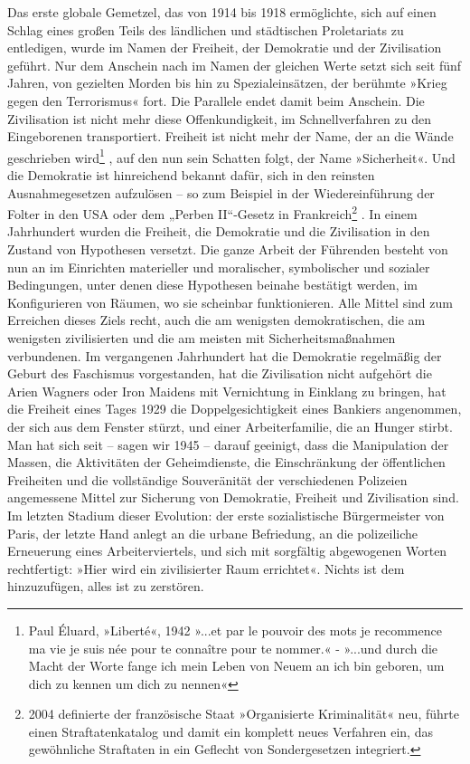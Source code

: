 
Das erste globale Gemetzel, das von 1914 bis 1918 ermöglichte, sich
auf einen Schlag eines großen Teils des ländlichen und städtischen
Proletariats zu entledigen, wurde im Namen der Freiheit, der
Demokratie und der Zivilisation geführt. Nur dem Anschein nach im
Namen der gleichen Werte setzt sich seit fünf Jahren, von gezielten
Morden bis hin zu Spezialeinsätzen, der berühmte »Krieg gegen den
Terrorismus« fort. Die Parallele endet damit beim Anschein. Die
Zivilisation ist nicht mehr diese Offenkundigkeit, im
Schnellverfahren zu den Eingeborenen transportiert. Freiheit ist
nicht mehr der Name, der an die Wände geschrieben wird\footnote{
Paul Éluard, »Liberté«, 1942 »...et par le pouvoir des mots
\textbar{} je recommence ma vie \textbar{} je suis née pour te
connaître \textbar{} pour te nommer.« - »...und durch die Macht der
Worte \textbar{} fange ich mein Leben von Neuem an \textbar{} ich
bin geboren, um dich zu kennen \textbar{} um dich zu nennen«
}%
, auf den
nun sein Schatten folgt, der Name »Sicherheit«. Und die Demokratie
ist hinreichend bekannt dafür, sich in den reinsten
Ausnahmegesetzen aufzulösen – so zum Beispiel in der
Wiedereinführung der Folter in den USA oder dem „Perben II“-Gesetz
in Frankreich\footnote{
2004 definierte der französische Staat »Organisierte
Kriminalität« neu, führte einen Straftatenkatalog und damit ein
komplett neues Verfahren ein, das gewöhnliche Straftaten in ein
Geflecht von Sondergesetzen integriert.
}%
.
In einem Jahrhundert wurden die Freiheit, die Demokratie und die
Zivilisation in den Zustand von Hypothesen versetzt. Die ganze
Arbeit der Führenden besteht von nun an im Einrichten materieller
und moralischer, symbolischer und sozialer Bedingungen, unter denen
diese Hypothesen beinahe bestätigt werden, im Konfigurieren von
Räumen, wo sie scheinbar funktionieren. Alle Mittel sind zum
Erreichen dieses Ziels recht, auch die am wenigsten demokratischen,
die am wenigsten zivilisierten und die am meisten mit
Sicherheitsmaßnahmen verbundenen. Im vergangenen Jahrhundert hat
die Demokratie regelmäßig der Geburt des Faschismus vorgestanden,
hat die Zivilisation nicht aufgehört die Arien Wagners oder Iron
Maidens mit Vernichtung in Einklang zu bringen, hat die Freiheit
eines Tages 1929 die Doppelgesichtigkeit eines Bankiers angenommen,
der sich aus dem Fenster stürzt, und einer Arbeiterfamilie, die an
Hunger stirbt. Man hat sich seit – sagen wir 1945 – darauf
geeinigt, dass die Manipulation der Massen, die Aktivitäten der
Geheimdienste, die Einschränkung der öffentlichen Freiheiten und
die vollständige Souveränität der verschiedenen Polizeien
angemessene Mittel zur Sicherung von Demokratie, Freiheit und
Zivilisation sind. Im letzten Stadium dieser Evolution: der erste
sozialistische Bürgermeister von Paris, der letzte Hand anlegt an
die urbane Befriedung, an die polizeiliche Erneuerung eines
Arbeiterviertels, und sich mit sorgfältig abgewogenen Worten
rechtfertigt: »Hier wird ein zivilisierter Raum errichtet«. Nichts
ist dem hinzuzufügen, alles ist zu zerstören.

